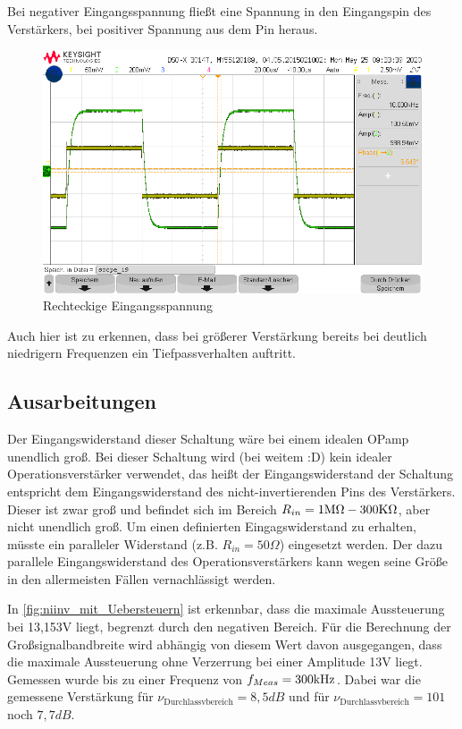 Bei negativer Eingangsspannung fließt eine Spannung in den Eingangspin des Verstärkers, bei positiver Spannung aus dem Pin heraus. 
\begin{figure}[H]
    \centering
    \includegraphics[width=\costumPicWidth]{Lab_1/Messungen/niinv_verst/square.png}
    \caption{Rechteckige Eingangsspannung}
    \label{fig:niinv_rechteck}
\end{figure}
Auch hier ist zu erkennen, dass bei größerer Verstärkung bereits bei deutlich niedrigern Frequenzen ein Tiefpassverhalten auftritt.

\subsection{Ausarbeitungen}
Der Eingangswiderstand dieser Schaltung wäre bei einem idealen OPamp unendlich groß. Bei dieser Schaltung wird (bei weitem :D) kein idealer Operationsverstärker verwendet, das heißt der Eingangswiderstand der Schaltung entspricht dem Eingangswiderstand des nicht-invertierenden Pins des Verstärkers. Dieser ist zwar groß und befindet sich im Bereich $R_{in}=1\text{M}\Omega-300\text{K}\Omega$, aber nicht unendlich groß. Um einen definierten Eingagswiderstand zu erhalten, müsste ein paralleler Widerstand (z.B. $R_{in}=50\Omega$) eingesetzt werden. Der dazu parallele Eingangswiderstand des Operationsverstärkers kann wegen seine Größe in den allermeisten Fällen vernachlässigt werden.


In \autoref{fig:niinv_mit_Uebersteuern} ist erkennbar, dass die maximale Aussteuerung bei 13,153V liegt, begrenzt durch den negativen Bereich. Für die Berechnung der Großsignalbandbreite wird abhängig von diesem Wert davon ausgegangen, dass die maximale Aussteuerung ohne Verzerrung bei einer Amplitude 13V liegt.
Gemessen wurde bis zu einer Frequenz von $f_{Meas}=300\text{kHz}$. Dabei war die gemessene Verstärkung für $\nu_{\text{Durchlassvbereich}}=8,5dB$  und für $\nu_{\text{Durchlassvbereich}}=101$ noch $7,7dB$.

